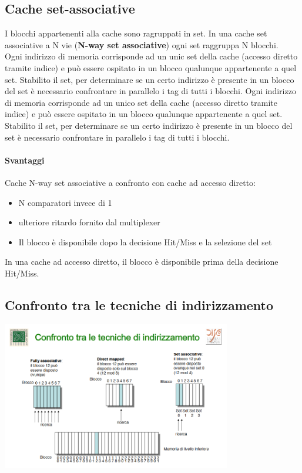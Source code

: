 \documentclass[12pt, a4paper, openany]{book}
\begin{document}
\subsection*{Cache set-associative}
I blocchi appartenenti alla cache sono ragruppati in set. In una cache set associative a N
vie (\textbf{N-way set associative}) ogni set raggruppa N blocchi.
\\ Ogni indirizzo di memoria corrisponde ad un unic set della cache (accesso diretto tramite indice)
e può essere ospitato in un blocco qualunque appartenente a quel set. 
Stabilito il set, per determinare se un certo indirizzo è presente in un blocco del set è necessario
confrontare in parallelo i tag di tutti i blocchi. Ogni indirizzo di memoria corrisponde
ad un unico set della cache (accesso diretto tramite indice) e può essere ospitato in
un blocco qualunque appartenente a quel set. Stabilito il set, per determinare se un certo
indirizzo è presente in un blocco del set è necessario confrontare in parallelo i tag di
tutti i blocchi.

\paragraph{Svantaggi} Cache N-way set associative a confronto con cache ad accesso diretto:
\begin{itemize}
    \item N comparatori invece di 1
    \item ulteriore ritardo fornito dal multiplexer
    \item Il blocco è disponibile dopo la decisione Hit/Miss e la selezione del set
\end{itemize}
In una cache ad accesso diretto, il blocco è disponibile prima della decisione Hit/Miss.

\subsection{Confronto tra le tecniche di indirizzamento}
\begin{center}
    \includegraphics[width=100mm, scale=0.5]{Cache - confronto tecniche di indirizzamento.png}
\end{center}
\end{document}
